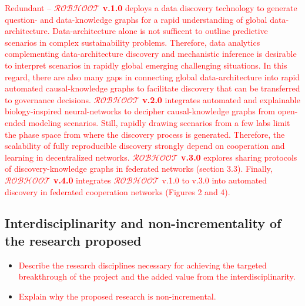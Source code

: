 \documentclass[11pt, a4paper]{article} %
\begin{document}
\textcolor{red}{Redundant -- {\bf $\mathcal{ROBHOOT}$ v.1.0} deploys
  a data discovery technology to generate question- and data-knowledge
  graphs for a rapid understanding of global
  data-architecture. Data-architecture alone is not sufficent to
  outline predictive scenarios in complex sustainability
  problems. Therefore, data analytics complementing data-architecture
  discovery and mechanistic inference is desirable to interpret
  scenarios in rapidly global emerging challenging situations. In this
  regard, there are also many gaps in connecting global
  data-architecture into rapid automated causal-knowledge graphs to
  facilitate discovery that can be transferred to governance
  decisions. {\bf $\mathcal{ROBHOOT}$ v.2.0} integrates automated and
  explainable biology-inspired neural-networks to decipher
  causal-knowledge graphs from open-ended modeling scenarios. Still,
  rapidly drawing scenarios from a few labs limit the phase space from
  where the discovery process is generated. Therefore, the scalability
  of fully reproducible discovery strongly depend on cooperation and
  learning in decentralized networks. {\bf $\mathcal{ROBHOOT}$ v.3.0}
  explores sharing protocols of discovery-knowledge graphs in
  federated networks (section 3.3). Finally, {\bf $\mathcal{ROBHOOT}$
    v.4.0} integrates $\mathcal{ROBHOOT}$ v.1.0 to v.3.0 into
  automated discovery in federated cooperation networks (Figures 2 and
  4).}

\subsection{Interdisciplinarity and non-incrementality of the research
  proposed}

\begin{itemize}
\item \textcolor{red}{Describe the research disciplines necessary for
    achieving the targeted breakthrough of the project and the added
    value from the interdisciplinarity.}
\item \textcolor{red}{Explain why the proposed research is
    non-incremental.}
  \end{itemize}
\end{document}
